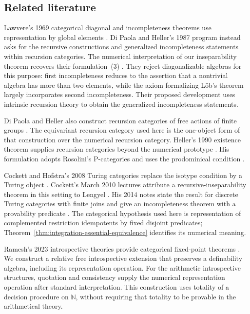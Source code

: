 \documentclass[11pt]{article}
\theoremstyle{definition}
\theoremstyle{remark}
\begin{document}
\subsection{Related literature}
\label{sec:related-literature}

Lawvere's 1969 categorical diagonal and incompleteness theorems
use representation by global elements
\cite[Theorems~2.2 and~3.3]{Lawvere}.
Di Paola and Heller's 1987 program instead asks for the recursive
constructions and generalized incompleteness statements within
recursion categories. The numerical interpretation of our
inseparability theorem recovers their formulation~(3)
\cite[pp.~594--596]{DPH}.
They reject diagonalizable algebras for this purpose: first
incompleteness reduces to the assertion that a nontrivial algebra
has more than two elements, while the axiom formalizing L\"ob's
theorem largely incorporates second incompleteness.
Their proposed development uses intrinsic recursion theory to
obtain the generalized incompleteness statements.

Di Paola and Heller also construct recursion categories of free
actions of finite groups
\cite[Section~7.9(3), Theorem~7.9.9]{DPH}.
The equivariant recursion category used here is the one-object
form of that construction over the numerical recursion category.
Heller's 1990 existence theorem supplies recursion categories
beyond the numerical prototype
\cite[Theorem~9.2 and Section~10]{Heller}.
His formulation adopts Rosolini's P-categories and uses the
prodominical condition \cite[Introduction and Section~5]{Heller}.

Cockett and Hofstra's 2008 Turing categories replace the isotype
condition by a Turing object
\cite[Sections~3.1 and~3.6]{TuringCategories}.
Cockett's March 2010 lectures attribute a recursive-inseparability
theorem in this setting to Lengyel
\cite[slides~33--34]{CockettSlides}.
His 2014 notes state the result for discrete Turing categories
with finite joins and give an incompleteness theorem with a
provability predicate
\cite[Section~7.1 and Theorems~7.8 and~7.14]{CockettNotes}.
The categorical hypothesis used here is representation of
complemented restriction idempotents by fixed disjoint predicates;
Theorem~\ref{thm:integration-essential-equivalence} identifies
its numerical meaning.

Ramesh's 2023 introspective theories provide categorical fixed-point
theorems \cite[Chapters~2--4]{Ramesh}.
We construct a relative free introspective extension that preserves
a definability algebra, including its representation operation.
For the arithmetic introspective structures, quotation and
consistency supply the numerical representation operation after
standard interpretation. This construction uses totality of a decision procedure on $\mathbb N$,
without requiring that totality to be provable in the arithmetical theory.
\end{document}
